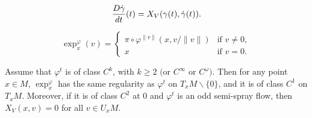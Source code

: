 \documentclass[10pt,a4paper]{amsart}
\begin{document}
 \begin{equation}\label{Dc'/dt=XV}
 \frac{{\rm D}\dot{\gamma}}{{\rm d}t}(t)= X_V(\gamma(t),\dot{\gamma}(t)).
 \end{equation}

\begin{equation}\label{def-psi-exp} \exp_x^{\varphi}(v) = \begin{cases} \pi \circ \varphi^{\|v\|}(x,v/\|v\|) &\text{if } v \neq 0, \\ x & \text{if } v = 0. \end{cases}\end{equation}

\begin{Lemma} \label{lem:dynamical-exp}
 Assume that $\varphi^t$ is of class $C^k$, with $k \geq 2$ $($or $C^\infty$ or $C^\omega)$. Then for any point $x\in M$, $\exp^\varphi_x$ has the same regularity as $\varphi^t$ on $T_xM\smallsetminus \{0\}$, and it is of class $C^1$ on $T_xM$. Moreover, if it is of class $C^2$ at $0$ and $\varphi^t$ is an odd semi-spray flow, then $X_V(x,v) = 0$ for all $v\in U_xM$.
\end{Lemma}
\end{document}
